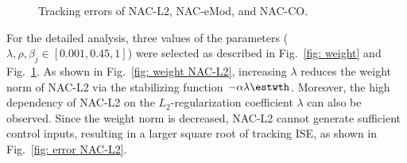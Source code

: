 \documentclass[letterpaper, 10 pt, conference]{ieeeconf}  %
\begin{document}
\begin{figure}[!t]      
    \centering
    \vfill
    \vfill
    \vfill
    \caption{Tracking errors of NAC-L2, NAC-eMod, and NAC-CO.}
    \label{fig: error}
\end{figure}

For the detailed analysis, three values of the parameters (\ie $\lambda,\rho,\beta_j\in[0.001,0.45,1]$) were selected as described in Fig.~\ref{fig: weight} and Fig.~\ref{fig: error}.
As shown in Fig.~\ref{fig: weight NAC-L2}, increasing $\lambda$ reduces the weight norm of NAC-L2 via the stabilizing function $-\alpha\lambda{\estwth}$.
Moreover, the high dependency of NAC-L2 on the $L_2$-regularization coefficient $\lambda$ can also be observed.
Since the weight norm is decreased, NAC-L2 cannot generate sufficient control inputs, resulting in a larger square root of tracking ISE, as shown in Fig.~\ref{fig: error NAC-L2}.
\end{document}
